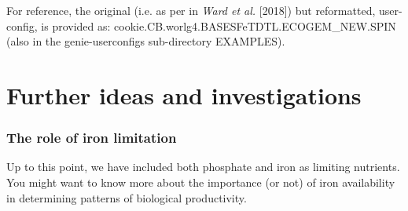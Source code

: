 \vspace{1mm}
\noindent For reference, the original (i.e. as per in \textit{Ward et al.} [2018]) but reformatted, user-config, is provided as: \textsf{\footnotesize cookie.CB.worlg4.BASESFeTDTL.ECOGEM\_NEW.SPIN} (also in the \textsf{\footnotesize genie-userconfigs} sub-directory \textsf{\footnotesize EXAMPLES}).

\newpage

\section{Further ideas and investigations}

\subsubsection{The role of iron limitation}
\vspace{1mm}

Up to this point, we have included both phosphate and iron as limiting nutrients. You might want to know more about the importance (or not) of iron availability in determining patterns of biological productivity.

